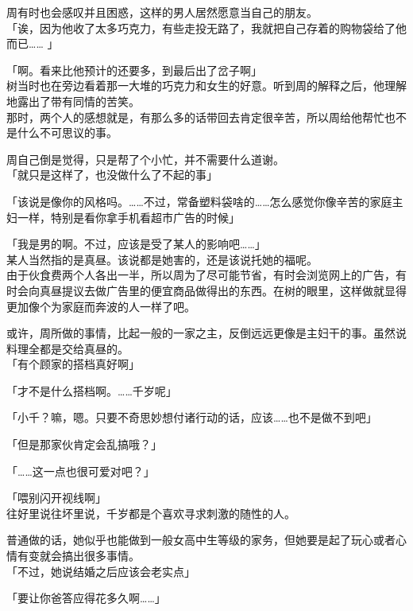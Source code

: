 周有时也会感叹并且困惑，这样的男人居然愿意当自己的朋友。\\

「诶，因为他收了太多巧克力，有些走投无路了，我就把自己存着的购物袋给了他而已…… 」

「啊。看来比他预计的还要多，到最后出了岔子啊」\\

树当时也在旁边看着那一大堆的巧克力和女生的好意。听到周的解释之后，他理解地露出了带有同情的苦笑。\\

那时，两个人的感想就是，有那么多的话带回去肯定很辛苦，所以周给他帮忙也不是什么不可思议的事。

周自己倒是觉得，只是帮了个小忙，并不需要什么道谢。\\

「就只是这样了，也没做什么了不起的事」

「该说是像你的风格吗。……不过，常备塑料袋啥的……怎么感觉你像辛苦的家庭主妇一样，特别是看你拿手机看超市广告的时候」

「我是男的啊。不过，应该是受了某人的影响吧……」\\

某人当然指的是真昼。该说都是她害的，还是该说托她的福呢。\\

由于伙食费两个人各出一半，所以周为了尽可能节省，有时会浏览网上的广告，有时会向真昼提议去做广告里的便宜商品做得出的东西。在树的眼里，这样做就显得更加像个为家庭而奔波的人一样了吧。

或许，周所做的事情，比起一般的一家之主，反倒远远更像是主妇干的事。虽然说料理全都是交给真昼的。\\

「有个顾家的搭档真好啊」

「才不是什么搭档啊。……千岁呢」

「小千？嘛，嗯。只要不奇思妙想付诸行动的话，应该……也不是做不到吧」

「但是那家伙肯定会乱搞哦？」

「……这一点也很可爱对吧？」

「喂别闪开视线啊」\\

往好里说往坏里说，千岁都是个喜欢寻求刺激的随性的人。

普通做的话，她似乎也能做到一般女高中生等级的家务，但她要是起了玩心或者心情有变就会搞出很多事情。\\

「不过，她说结婚之后应该会老实点」

「要让你爸答应得花多久啊……」\\

